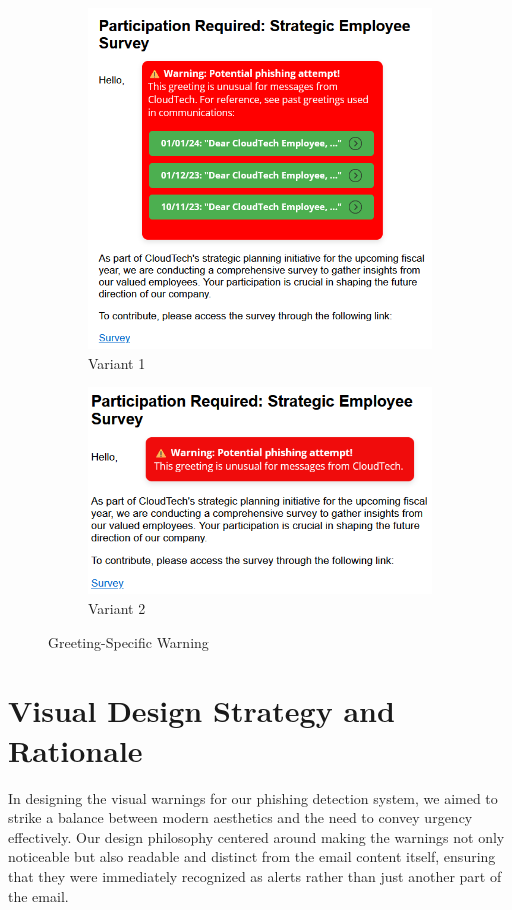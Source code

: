 \documentclass[
  a4paper,  %
  twoside,  %
  bibliography=totoc,
  headsepline,
  cleardoublepage=empty,
  parskip=half,
  draft=false
]{scrbook}
\begin{document}
\begin{figure} [h]
\centering
\begin{subfigure}{.5\textwidth}
  \centering
  \includegraphics[width=.9\linewidth]{figures/greeting1.png}
  \caption{Variant 1}
  \label{fig:greeting1}
\end{subfigure}%
\begin{subfigure}{.5\textwidth}
  \centering
  \includegraphics[width=.9\linewidth]{figures/greeting2.png}
  \caption{Variant 2}
  \label{fig:greeting2}
\end{subfigure}
\caption{Greeting-Specific Warning}
\label{fig:greeting}
\end{figure}

\section{Visual Design Strategy and Rationale}
In designing the visual warnings for our phishing detection system, we aimed to strike a balance between modern aesthetics and the need to convey urgency effectively. Our design philosophy centered around making the warnings not only noticeable but also readable and distinct from the email content itself, ensuring that they were immediately recognized as alerts rather than just another part of the email.
\end{document}
